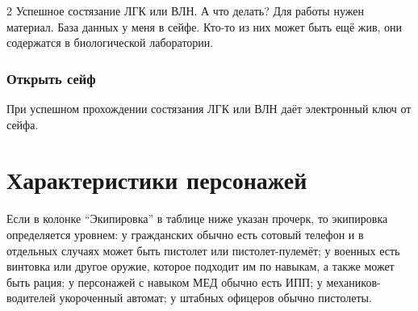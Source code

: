 \documentclass[twoside]{article}
\begin{document}
\begin{multicols}{2}
Успешное состязание ЛГК или ВЛН. А что делать? Для работы нужен
материал. База данных у меня в сейфе. Кто-то из них может быть ещё жив,
они содержатся в биологической лаборатории.

\subsubsection{Открыть сейф}\label{open-safe}

При успешном прохождении состязания ЛГК или ВЛН даёт электронный ключ от
сейфа.

\end{multicols}

\clearpage

\section{Характеристики персонажей}\label{character-stats}

Если в колонке \enquote{Экипировка} в таблице ниже указан прочерк, то экипировка определяется уровнем:
у гражданских обычно есть сотовый телефон и в отдельных случаях может быть пистолет или пистолет-пулемёт;
у военных есть винтовка или другое оружие, которое подходит им по навыкам, а также может быть рация;
у персонажей с навыком МЕД обычно есть ИПП;
у механиков-водителей укороченный автомат;
у штабных офицеров обычно пистолеты.
\end{document}
